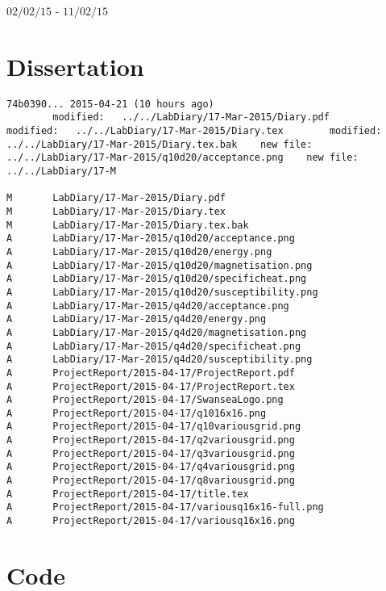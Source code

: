 \documentclass[12pt,a4paper,notitlepage,twoside]{memoir}
\author{Robert James}
\begin{document}
\begin{Large}
\begin{center}
$02/02/15$ - $11/02/15$
\end{center}
\end{Large}

\section{Dissertation}

\begin{lstlisting}[breaklines]
74b0390... 2015-04-21 (10 hours ago)
        modified:   ../../LabDiary/17-Mar-2015/Diary.pdf        modified:   ../../LabDiary/17-Mar-2015/Diary.tex        modified:   ../../LabDiary/17-Mar-2015/Diary.tex.bak    new file:   ../../LabDiary/17-Mar-2015/q10d20/acceptance.png    new file:   ../../LabDiary/17-M

M       LabDiary/17-Mar-2015/Diary.pdf
M       LabDiary/17-Mar-2015/Diary.tex
M       LabDiary/17-Mar-2015/Diary.tex.bak
A       LabDiary/17-Mar-2015/q10d20/acceptance.png
A       LabDiary/17-Mar-2015/q10d20/energy.png
A       LabDiary/17-Mar-2015/q10d20/magnetisation.png
A       LabDiary/17-Mar-2015/q10d20/specificheat.png
A       LabDiary/17-Mar-2015/q10d20/susceptibility.png
A       LabDiary/17-Mar-2015/q4d20/acceptance.png
A       LabDiary/17-Mar-2015/q4d20/energy.png
A       LabDiary/17-Mar-2015/q4d20/magnetisation.png
A       LabDiary/17-Mar-2015/q4d20/specificheat.png
A       LabDiary/17-Mar-2015/q4d20/susceptibility.png
A       ProjectReport/2015-04-17/ProjectReport.pdf
A       ProjectReport/2015-04-17/ProjectReport.tex
A       ProjectReport/2015-04-17/SwanseaLogo.png
A       ProjectReport/2015-04-17/q1016x16.png
A       ProjectReport/2015-04-17/q10variousgrid.png
A       ProjectReport/2015-04-17/q2variousgrid.png
A       ProjectReport/2015-04-17/q3variousgrid.png
A       ProjectReport/2015-04-17/q4variousgrid.png
A       ProjectReport/2015-04-17/q8variousgrid.png
A       ProjectReport/2015-04-17/title.tex
A       ProjectReport/2015-04-17/variousq16x16-full.png
A       ProjectReport/2015-04-17/variousq16x16.png

\end{lstlisting}

\section{Code}
\end{document}
